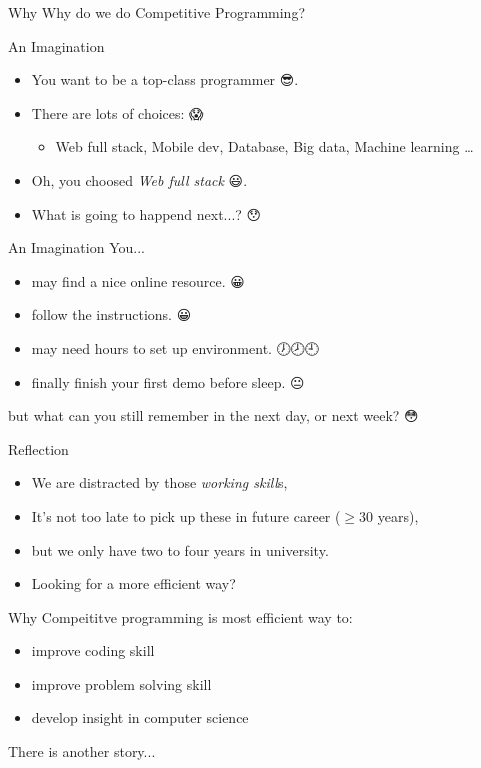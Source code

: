 \begin{frame}{Why}
  \centering
  \huge{Why do we do Competitive Programming?}
\end{frame}

\begin{frame}{An Imagination}
\begin{itemize}
  \item<1-> You want to be a top-class programmer 😎.
  \item<2-> There are lots of choices: 😱
    \begin{itemize}
      \item<3-> Web full stack, Mobile dev,
      Database, Big data, Machine learning \ldots
    \end{itemize}
  \item<4-> Oh, you choosed \textit{Web full stack} 😃.
  \item<5-> What is going to happend next...? 😯
\end{itemize}
\end{frame}

\begin{frame}{An Imagination}
You...
\begin{itemize}
  \item<2-> may find a nice online resource. 😀
  \item<3-> follow the instructions. 😀
  \item<4-> may need hours to set up environment. 🕖🕗🕘
  \item<5-> finally finish your first demo before sleep. 😐
\end{itemize}
 but what can you still remember in the next day, or next week? 😳
\end{frame}

\begin{frame}{Reflection}
\begin{itemize}
  \item<2-> We are distracted by those \textit{working skill}s,
  \item<3-> It's not too late to pick up these in future career ($\ge 30$ years),
  \item<4-> but we only have two to four years in university.
  \item<5-> Looking for a more efficient way?
\end{itemize}
\end{frame}

\begin{frame}{Why}
 Compeititve programming is most efficient way to:
\begin{itemize}
  \item<2-> improve coding skill
  \item<3-> improve problem solving skill
  \item<4-> develop insight in computer science
\end{itemize}
 There is another story...
\end{frame}

